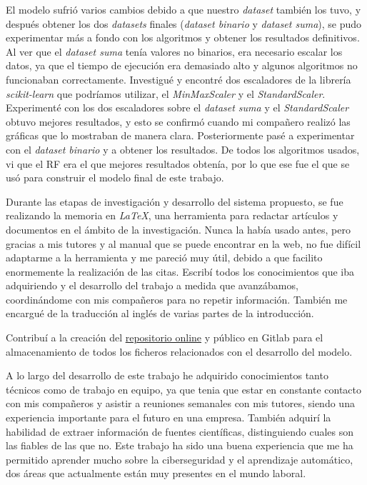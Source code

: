 El modelo sufrió varios cambios debido a que nuestro \textit{dataset} también los tuvo, y después obtener los dos \textit{datasets} finales (\textit{dataset binario} y \textit{dataset suma}), se pudo experimentar más a fondo con los algoritmos y obtener los resultados definitivos. Al ver que el \textit{dataset suma} tenía valores no binarios, era necesario escalar los datos, ya que el tiempo de ejecución era demasiado alto y algunos algoritmos no funcionaban correctamente. Investigué y encontré dos escaladores de la librería \textit{scikit-learn} que podríamos utilizar, el \textit{MinMaxScaler} y el \textit{StandardScaler}. Experimenté con los dos escaladores sobre el \textit{dataset suma} y el \textit{StandardScaler} obtuvo mejores resultados, y esto se confirmó cuando mi compañero realizó las gráficas que lo mostraban de manera clara. Posteriormente pasé a experimentar con el \textit{dataset binario} y a obtener los resultados. De todos los algoritmos usados, vi que el \gls{RF} era el que mejores resultados obtenía, por lo que ese fue el que se usó para construir el modelo final de este trabajo.

Durante las etapas de investigación y desarrollo del sistema propuesto, se fue realizando la memoria en \textit{LaTeX}, una herramienta para redactar artículos y documentos en el ámbito de la investigación. Nunca la había usado antes, pero gracias a mis tutores y al manual que se puede encontrar en la web, no fue difícil adaptarme a la herramienta y me pareció muy útil, debido a que facilito enormemente la realización de las citas. Escribí todos los conocimientos que iba adquiriendo y el desarrollo del trabajo a medida que avanzábamos, coordinándome con mis compañeros para no repetir información. También me encargué de la traducción al inglés de varias partes de la introducción. 

Contribuí a la creación del \href{https://gitlab.fdi.ucm.es/marina.lopez/tfg-ransomware-20-21}{repositorio online} y público en Gitlab para el almacenamiento de todos los ficheros relacionados con el desarrollo del modelo.

A lo largo del desarrollo de este trabajo he adquirido conocimientos tanto técnicos como de trabajo en equipo, ya que tenia que estar en constante contacto con mis compañeros y asistir a reuniones semanales con mis tutores, siendo una experiencia importante para el futuro en una empresa. También adquirí la habilidad de extraer información de fuentes científicas, distinguiendo cuales son las fiables de las que no. Este trabajo ha sido una buena experiencia que me ha permitido aprender mucho sobre la ciberseguridad y el aprendizaje automático, dos áreas que actualmente están muy presentes en el mundo laboral. 



